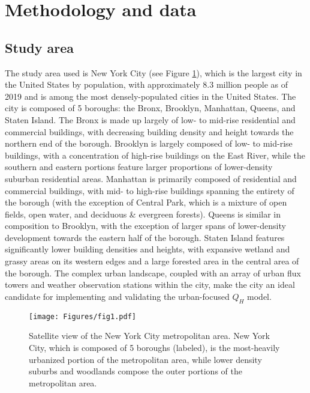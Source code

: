 \section{Methodology and data}

\subsection{Study area}

The study area used is New York City (see Figure \ref{fig:nyc_view}), which is the largest city in the United States by population, with approximately 8.3 million people as of 2019 \citep{bureau_population_nodate} and is among the most densely-populated cities in the United States. The city is composed of 5 boroughs: the Bronx, Brooklyn, Manhattan, Queens, and Staten Island. The Bronx is made up largely of low- to mid-rise residential and commercial buildings, with decreasing building density and height towards the northern end of the borough. Brooklyn is largely composed of low- to mid-rise buildings, with a concentration of high-rise buildings on the East River, while the southern and eastern portions feature larger proportions of lower-density suburban residential areas. Manhattan is primarily composed of residential and commercial buildings, with mid- to high-rise buildings spanning the entirety of the borough (with the exception of Central Park, which is a mixture of open fields, open water, and deciduous \& evergreen forests).  Queens is similar in composition to Brooklyn, with the exception of larger spans of lower-density development towards the eastern half of the borough. Staten Island features significantly lower building densities and heights, with expansive wetland and grassy areas on its western edges and a large forested area in the central area of the borough. The complex urban landscape, coupled with an array of urban flux towers and weather observation stations within the city, make the city an ideal candidate for implementing and validating the urban-focused $Q_H$ model.

\begin{figure}[!h]
    \centering
      \texttt{[image: Figures/fig1.pdf]}
      \caption{Satellite view of the New York City metropolitan area. New York City, which is composed of 5 boroughs (labeled), is the most-heavily urbanized portion of the metropolitan area, while lower density suburbs and woodlands compose the outer portions of the metropolitan area.}
      \label{fig:nyc_view}
\end{figure}

